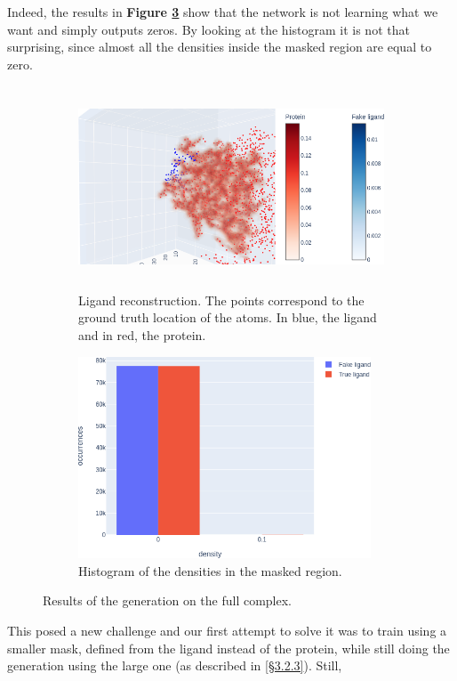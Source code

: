\documentclass{article}
\begin{document}
Indeed, the results in \textbf{Figure \ref{fig:result_complex}} show that the network is not learning what we want and simply outputs zeros. By looking at the histogram it is not that surprising, since almost all the densities inside the masked region are equal to zero.
\begin{figure}[H]
    \centering
    \begin{subfigure}{.5\textwidth}
        \centering
        \includegraphics[height=6cm,width=\textwidth,keepaspectratio]{result_complex-quali.png}
        \caption{Ligand reconstruction. The points correspond to the ground truth location of the atoms. In blue, the ligand and in red, the protein.}
        \label{fig:result_complex-quali}
    \end{subfigure}%
    \begin{subfigure}{.5\textwidth}
        \centering
        \includegraphics[height=6cm,width=\textwidth,keepaspectratio]{result_complex-hist.png}
        \caption{Histogram of the densities in the masked region.}
        \label{fig:result_complex-hist}
    \end{subfigure}
    \caption{Results of the generation on the full complex.}
    \label{fig:result_complex}
\end{figure}
This posed a new challenge and our first attempt to solve it was to train using a smaller mask, defined from the ligand instead of the protein, while still doing the generation using the large one (as described in \hyperref[sec:input_output_mask]{[\S3.2.3]}). Still,
\end{document}
